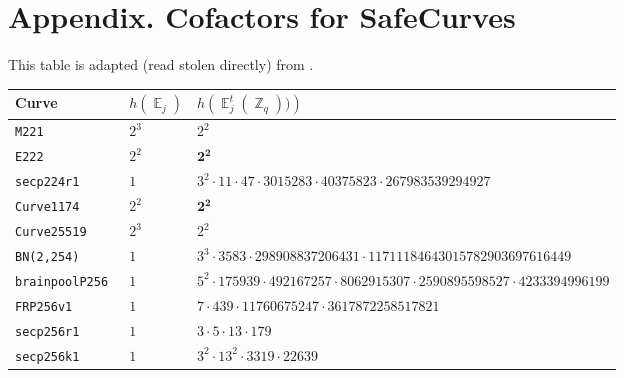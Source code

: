 \documentclass[11pt,fleqn]{article}
\newcommand{\Ejt}{\ensuremath{\BbbE^t_j(\BbbZ_q))} }
\newcommand{\Ej}{\ensuremath{\BbbE_j} }
\begin{document}
\section*{Appendix. Cofactors for SafeCurves}

This table is adapted (read stolen directly) from \cite{safecurves}.


%
\begin{tabularx}{\textwidth}{llR}
\textbf{Curve}            &$h(\Ej)$ & $h(\Ejt)$ \\
\hline
\texttt{\footnotesize M221         }& $\scriptstyle 2^3$    & $\scriptstyle 2^2                                                                  $\\
\texttt{\footnotesize E222         }& $\scriptstyle 2^2$    & $\scriptstyle \mathbf{2^2}                                                                  $\\
\texttt{\footnotesize secp224r1     }& $\scriptstyle 1  $    & $\scriptstyle 3^2 \cdot 11 \cdot 47 \cdot 3015283 \cdot 40375823 \cdot 267983539294927                 $\\
\texttt{\footnotesize Curve1174     }& $\scriptstyle 2^2$    & $\scriptstyle \mathbf{2^2}                                                                  $\\
\texttt{\footnotesize Curve25519    }& $\scriptstyle 2^3$    & $\scriptstyle 2^2                                                                  $\\
\texttt{\footnotesize BN(2,254)     }& $\scriptstyle 1  $    & $\scriptstyle 3^3 \cdot 3583 \cdot 298908837206431 \cdot 11711184643015782903697616449         $\\
\texttt{\footnotesize brainpoolP256 }& $\scriptstyle 1  $    & $\scriptstyle 5^2 \cdot 175939 \cdot 492167257 \cdot 8062915307 \cdot 2590895598527 \cdot 4233394996199$\\
\texttt{\footnotesize FRP256v1      }& $\scriptstyle 1  $    & $\scriptstyle 7 \cdot 439 \cdot 11760675247 \cdot 3617872258517821                             $\\
\texttt{\footnotesize secp256r1     }& $\scriptstyle 1  $    & $\scriptstyle 3 \cdot 5 \cdot 13 \cdot 179                                                     $\\
\texttt{\footnotesize secp256k1     }& $\scriptstyle 1  $    & $\scriptstyle 3^2 \cdot 13^2 \cdot 3319 \cdot 22639                                            $\\

\end{tabularx}
\end{document}
